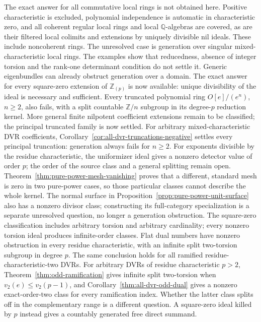 \documentclass[11pt,a4paper]{article}
\theoremstyle{definition}\newtheorem{definition}[theorem]{Definition}
\theoremstyle{remark}\newtheorem{remark}[theorem]{Remark}
\newcommand{\Z}{\mathbb Z}\newcommand{\Q}{\mathbb Q}
\begin{document}
The exact answer for all commutative local rings is not obtained
here.  Positive characteristic is excluded, polynomial
independence is automatic in characteristic zero, and all
coherent regular local rings and local $\Q$-algebras are covered,
as are their filtered local colimits and extensions by uniquely
divisible nil ideals.  These include noncoherent rings.
The unresolved case is generation over singular
mixed-characteristic local rings.  The examples show that
reducedness, absence of integer torsion and the rank-one
determinant condition do not settle it.  Generic eigenbundles can
already obstruct generation over a domain.
The exact answer for every square-zero extension of $\Z_{(p)}$ is
now available: unique divisibility of the ideal is necessary and
sufficient.  Every truncated polynomial ring $O[e]/(e^n)$, $n\ge2$, also fails,
with a split countable $\Z/n$ subgroup in its degree-$p$ reduction
kernel.  More general finite nilpotent coefficient extensions remain
to be classified; the principal truncated family is now settled.  For arbitrary mixed-characteristic DVR coefficients,
Corollary~\ref{cor:all-dvr-truncations-negative} settles every
principal truncation: generation always fails for $n\ge2$.
For exponents divisible by the residue characteristic, the
uniformizer ideal gives a nonzero detector value of order $p$;
the order of the source class and a general splitting remain open.
Theorem~\ref{thm:pure-power-mesh-vanishing} proves that a different,
standard mesh is zero in two pure-power cases, so those particular
classes cannot describe the whole kernel.  The normal surface in
Proposition~\ref{prop:pure-power-unit-surface} also has a nonzero
divisor class; constructing its full-category specialization is a
separate unresolved question, no longer a generation obstruction.
The square-zero classification includes arbitrary
torsion and arbitrary cardinality;
every nonzero torsion ideal produces infinite-order classes.  Flat dual numbers have nonzero
obstruction in every residue characteristic, with an infinite split
two-torsion subgroup in degree $p$.  The same conclusion holds for
all ramified residue-characteristic-two DVRs.  For arbitrary DVRs
of residue characteristic $p>2$,
Theorem~\ref{thm:odd-ramification} gives infinite split two-torsion
when $v_2(e)\le v_2(p-1)$, and
Corollary~\ref{thm:all-dvr-odd-dual} gives a nonzero exact-order-two
class for every ramification index.  Whether the latter class
splits off in the complementary range is a different question.
A square-zero ideal
killed by $p$ instead gives a countably generated free direct summand.
\end{document}

